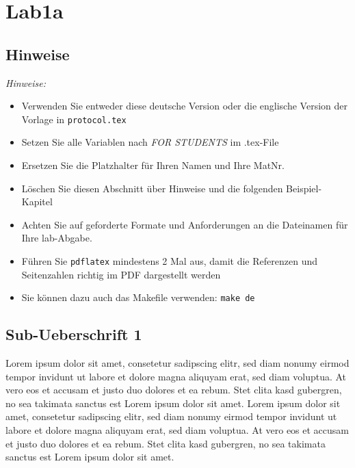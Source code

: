 \documentclass[12pt,a4paper,titlepage,oneside]{scrartcl}
\begin{document}
\maketitle
\setcounter{section}{0}
\setcounter{tocdepth}{2}
\tableofcontents

%
%

\section{Lab1a}

\subsection{Hinweise}
\emph{Hinweise:}
\begin{itemize}
    \item Verwenden Sie entweder diese deutsche Version oder die englische Version der Vorlage in \lstinline{protocol.tex}
    \item Setzen Sie alle Variablen nach \emph{FOR STUDENTS} im .tex-File
    \item Ersetzen Sie die Platzhalter für Ihren Namen und Ihre MatNr.
    \item Löschen Sie diesen Abschnitt über Hinweise und die folgenden Beispiel-Kapitel
    \item Achten Sie auf geforderte Formate und Anforderungen an die Dateinamen für Ihre lab-Abgabe.
    \item Führen Sie \lstinline{pdflatex} mindestens 2 Mal aus, damit die Referenzen und Seitenzahlen richtig im PDF dargestellt werden
    \item Sie können dazu auch das Makefile verwenden: \lstinline{make de}
\end{itemize}

\subsection{Sub-Ueberschrift 1}
Lorem ipsum dolor sit amet, consetetur sadipscing elitr, sed diam nonumy eirmod tempor invidunt ut labore et dolore magna aliquyam erat, sed diam voluptua. At vero eos et accusam et justo duo dolores et ea rebum. Stet clita kasd gubergren, no sea takimata sanctus est Lorem ipsum dolor sit amet. Lorem ipsum dolor sit amet, consetetur sadipscing elitr, sed diam nonumy eirmod tempor invidunt ut labore et dolore magna aliquyam erat, sed diam voluptua. At vero eos et accusam et justo duo dolores et ea rebum. Stet clita kasd gubergren, no sea takimata sanctus est Lorem ipsum dolor sit amet.
\end{document}
